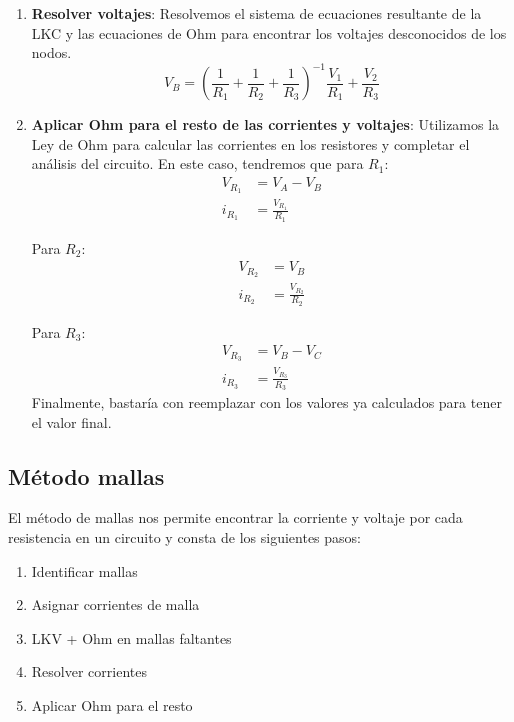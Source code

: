 \begin{example}
\begin{enumerate}
        \item \textbf{Resolver voltajes}: Resolvemos el sistema de ecuaciones resultante de la LKC y las ecuaciones de Ohm para encontrar los voltajes desconocidos de los nodos.
              \begin{equation*}
                  V_B=(\frac{1}{R_1}+\frac{1}{R_2}+\frac{1}{R_3})^{-1}\frac{V_1}{R_1}+\frac{V_2}{R_3}
              \end{equation*}

        \item \textbf{Aplicar Ohm para el resto de las corrientes y voltajes}: Utilizamos la Ley de Ohm para calcular las corrientes en los resistores y completar el análisis del circuito.
              En este caso, tendremos que para $R_1$:
              \begin{align*}
                  V_{R_1} & =V_A-V_B             \\
                  i_{R_1} & =\frac{V_{R_1}}{R_1}
              \end{align*}

              Para $R_2$:
              \begin{align*}
                  V_{R_2} & =V_B                 \\
                  i_{R_2} & =\frac{V_{R_2}}{R_2}
              \end{align*}

              Para $R_3$:
              \begin{align*}
                  V_{R_3} & =V_B-V_C             \\
                  i_{R_3} & =\frac{V_{R_3}}{R_3}
              \end{align*}
              Finalmente, bastaría con reemplazar con los valores ya calculados para tener el valor final.
    \end{enumerate}



\end{example}

\subsection{Método mallas}
El método de mallas nos permite encontrar la corriente y voltaje por cada resistencia en un circuito y consta de los siguientes pasos:
\begin{enumerate}
    \item Identificar mallas
    \item Asignar corrientes de malla
    \item LKV + Ohm en mallas faltantes
    \item Resolver corrientes
    \item Aplicar Ohm para el resto
\end{enumerate}

